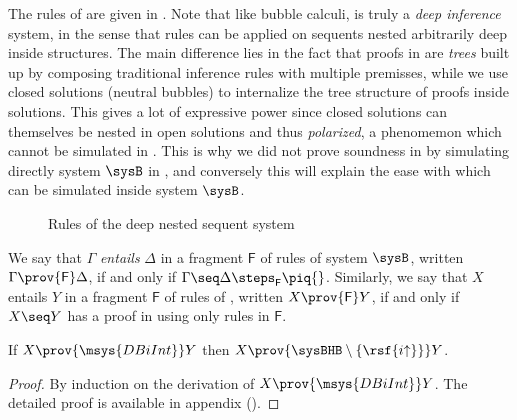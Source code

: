 The rules of  are given in . Note that like
bubble calculi,  is truly a \emph{deep inference} system, in the
sense that rules can be applied on sequents nested arbitrarily deep inside
structures. The main difference lies in the fact
that proofs in  are \emph{trees} built up by composing traditional
inference rules with multiple premisses, while we use closed solutions (neutral
bubbles) to internalize the tree structure of proofs inside solutions. This
gives a lot of expressive power since closed solutions can themselves be nested
in open solutions and thus \emph{polarized}, a phenomemon which cannot be
simulated in . This is why we did not prove soundness in
 by simulating directly system $\sysB$ in
, and conversely this will explain the ease with which 
can be simulated inside system $\sysB$.

\begin{figure*}
  
  \caption{Rules of the deep nested sequent system }
\end{figure*}

\begin{definition}
  We say that $\Gamma$ \emph{entails} $\Delta$ in a fragment $\mathsf{F}$ of
  rules of system $\sysB$, written $\Gamma \prov{\mathsf{F}} \Delta$, if and
  only if $\Gamma \seq \Delta \steps_{\mathsf{F}} \piq{}$. Similarly, we say
  that $X$ entails $Y$ in a fragment $\mathsf{F}$ of rules of ,
  written $X \prov{\mathsf{F}} Y$, if and only if $X \seq Y$ has a proof in
   using only rules in $\mathsf{F}$.
\end{definition}

\begin{lemma}
  
  If $X \prov{\msys{DBiInt}} Y$ then $X \prov{\sysBHB \setminus
  \{\rsf{i{\uparrow}}\}} Y$.
\end{lemma}
\begin{proof}
  By induction on the derivation of $X \prov{\msys{DBiInt}} Y$. The detailed
  proof is available in appendix (). 
\end{proof}

